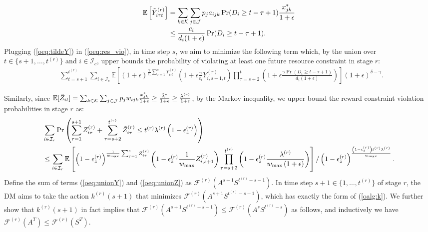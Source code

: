 \documentclass[letterpaper, 10 pt, conference]{ieeeconf}  %
\makeatletter
\renewenvironment{proof}[1][\relax]{\par
  \pushQED{\qed}%
  \normalfont \topsep6\p@\@plus6\p@\relax
  \trivlist
  \item[\hskip\labelsep\itshape
    \ifx#1\relax \proofname\else\proofname{} of #1\fi\@addpunct{.}]\ignorespaces
}{%
  \popQED\endtrivlist\@endpefalse
}
\newcommand{\III}{\mathcal{I}}
\newcommand{\JJJ}{\mathcal{J}}
\newcommand{\KKK}{\mathcal{K}}
\theoremstyle{plain}
\theoremstyle{definition}
\theoremstyle{remark}
\makeatother
\begin{document}
\begin{proof}
\begin{align}
\mathbb{E}\left[\Tilde{Y}^{(r)}_{i \tau t}\right] & = \sum_{k \in \KKK} \sum_{j \in \JJJ} p_j a_{ijk} \Pr(D_i \geq t - \tau +1) \frac{x^*_{jk}}{1+\epsilon} \nonumber \\
& \leq \frac{c_i}{d_i(1+\epsilon)} \Pr(D_i \geq t - \tau +1). \label{oeq:tildeY}
\end{align}
Plugging (\ref{oeq:tildeY}) in (\ref{oeq:res_vio}), in time step $s$, we aim to minimize the following term which, by the union over $t \in \{s+1, \ldots, t^{(r)}\}$ and $i \in \III_c$, upper bounds the probability of violating at least one future resource constraint in stage $r$:
\begin{align}
& \sum^{t^{(r)}}_{t=s+1} \sum_{i \in \III_c} \mathbb{E}\left[\left(1+\epsilon\right)^{\frac{\gamma}{c_i} \sum^{s}_{\tau=1} Y^{(r)}_{i \tau t}} \left(1+\epsilon \frac{\gamma}{c_i} Y^{(r)}_{i,s+1,t}\right) \prod^{t}_{\tau=s+2} \left(1+\epsilon \frac{\gamma \Pr\left(D_i \geq t-\tau+1\right)}{d_i \left(1+\epsilon\right)}\right)\right] (1+\epsilon)^{\delta - \gamma}. \label{oeq:unionY}
\end{align}

Similarly, since $\mathbb{E}[\Tilde{Z}_{it}]=\sum_{k \in \KKK} \sum_{j \in \JJJ} p_j w_{ijk} \frac{x^*_{jk}}{1+\epsilon} \geq \frac{\Tilde{\lambda}^*}{1+\epsilon} \geq \frac{\lambda^{(r)}}{1+\epsilon}$, by the Markov inequality, we upper bound the reward constraint violation probabilities in stage $r$ as:
\begin{align}
& \sum_{i \in \III_r} \Pr\left(\sum^{s+1}_{\tau=1} Z^{(r)}_{i \tau}+ \sum^{t^{(r)}}_{\tau=s+2} \Tilde{Z}^{(r)}_{i \tau} \leq t^{(r)} \lambda^{(r)} \left(1-\epsilon^{(r)}_{z}\right)\right) \nonumber \\
& \leq \sum_{i \in \III_r} \mathbb{E}\left[\left(1-\epsilon^{(r)}_{z}\right)^{\frac{1}{w_{\max}} \sum^{s}_{\tau=1} Z^{(r)}_{i \tau}} \left(1-\epsilon^{(r)}_{z} \frac{1}{w_{\max}} Z^{(r)}_{i,s+1}\right) \prod^{t^{(r)}}_{\tau=s+2} \left(1-\epsilon^{(r)}_{z} \frac{\lambda^{(r)}}{w_{\max} \left(1+\epsilon\right)}\right)\right] / \left(1-\epsilon^{(r)}_{z}\right)^{\frac{\left(1-\epsilon^{(r)}_{z}\right) t^{(r)} \lambda^{(r)}}{w_{\max}}}. \label{oeq:unionZ}
\end{align}
Define the sum of terms (\ref{oeq:unionY}) and (\ref{oeq:unionZ}) as $\mathcal{F}^{(r)}(A^{s+1} S^{t^{(r)}-s-1})$. In time step $s+1 \in \{1,\ldots,t^{(r)}\}$ of stage $r$, the DM aims to take the action $k^{(r)}(s+1)$ that minimizes $\mathcal{F}^{(r)}(A^{s+1} S^{t^{(r)}-s-1})$, which has exactly the form of (\ref{oalg:k}). We further show that $k^{(r)}(s+1)$ in fact implies that $\mathcal{F}^{(r)}(A^{s+1} S^{t^{(r)}-s-1}) \leq \mathcal{F}^{(r)}(A^s S^{t^{(r)}-s})$ as follows, and inductively we have $\mathcal{F}^{(r)}(A^T) \leq \mathcal{F}^{(r)}(S^T)$.


\end{proof}
\end{document}
